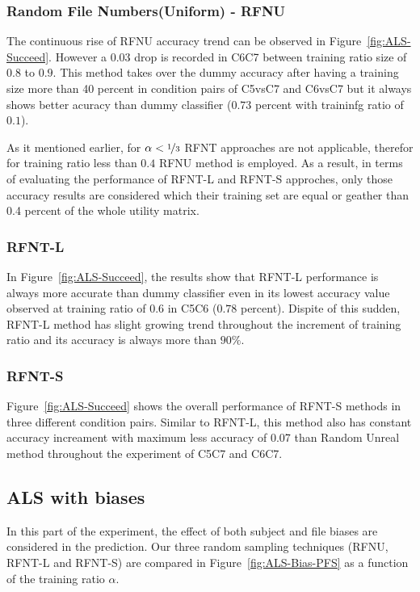 \documentclass[10pt, conference, compsocconf]{IEEEtran}
\begin{document}
\subsubsection{Random File Numbers(Uniform) - RFNU}
The continuous rise of RFNU accuracy trend can be observed in Figure~\ref{fig:ALS-Succeed}.
However a 0.03 drop is recorded in C6C7 between training ratio size of $0.8$ to $0.9$. 
This method takes over the dummy accuracy after having a training size more than 40 percent 
in condition pairs of C5vsC7 and C6vsC7 but it always shows better acuracy than 
dummy classifier ($0.73$ percent with traininfg ratio of $0.1$).\newline

\indent As it mentioned earlier, for $\alpha < \nicefrac{1}{3}$ RFNT approaches are not applicable, 
therefor for training ratio less than $0.4$ RFNU method is employed. As a result, in terms of 
evaluating the performance of RFNT-L and RFNT-S approches, only those accuracy results are 
considered which their training set are equal or geather than 0.4 percent of the whole utility matrix.\newline 

\subsubsection{RFNT-L}

In Figure~\ref{fig:ALS-Succeed}, the results show that RFNT-L performance is always more accurate than
dummy classifier even in its lowest accuracy value observed at training ratio of $0.6$ in C5C6 ($0.78$ percent).
Dispite of this sudden, RFNT-L method has slight growing trend throughout the 
increment of training ratio and its accuracy is always more than $90\%$. 

\subsubsection{RFNT-S}
Figure~\ref{fig:ALS-Succeed} shows the overall performance of RFNT-S methods in three different condition pairs.
Similar to RFNT-L, this method also has constant accuracy increament with maximum less accuracy of 0.07 than 
Random Unreal method throughout the experiment of C5C7 and C6C7.

\subsection{ALS with biases}
In this part of the experiment, the effect of both subject and file 
biases are considered in the prediction. Our three random sampling 
techniques (RFNU, RFNT-L and RFNT-S) are compared in 
Figure~\ref{fig:ALS-Bias-PFS} as a function of the training 
ratio $\alpha$.
\end{document}
